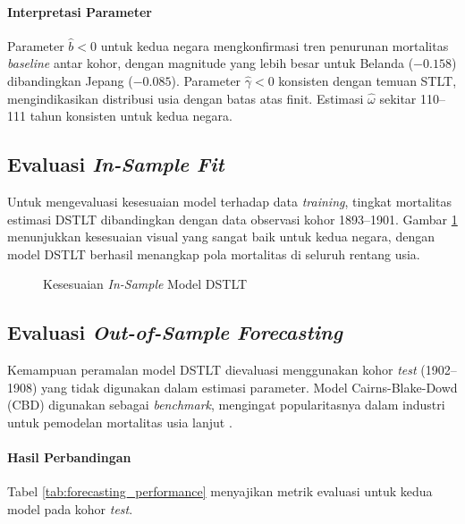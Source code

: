 \paragraph{Interpretasi Parameter}
Parameter $\hat{b} < 0$ untuk kedua negara mengkonfirmasi tren penurunan mortalitas \textit{baseline} antar kohor, dengan magnitude yang lebih besar untuk Belanda ($-0.158$) dibandingkan Jepang ($-0.085$). Parameter $\hat{\gamma} < 0$ konsisten dengan temuan STLT, mengindikasikan distribusi usia dengan batas atas finit. Estimasi $\hat{\omega}$ sekitar 110--111 tahun konsisten untuk kedua negara.

\subsection{Evaluasi \textit{In-Sample Fit}}

Untuk mengevaluasi kesesuaian model terhadap data \textit{training}, tingkat mortalitas estimasi DSTLT dibandingkan dengan data observasi kohor 1893--1901. Gambar \ref{fig:dstlt_insample} menunjukkan kesesuaian visual yang sangat baik untuk kedua negara, dengan model DSTLT berhasil menangkap pola mortalitas di seluruh rentang usia.

\begin{figure}[htbp]
\centering
{}
\caption{Kesesuaian \textit{In-Sample} Model DSTLT}
\label{fig:dstlt_insample}
\end{figure}

\subsection{Evaluasi \textit{Out-of-Sample Forecasting}}

Kemampuan peramalan model DSTLT dievaluasi menggunakan kohor \textit{test} (1902--1908) yang tidak digunakan dalam estimasi parameter. Model Cairns-Blake-Dowd (CBD) digunakan sebagai \textit{benchmark}, mengingat popularitasnya dalam industri untuk pemodelan mortalitas usia lanjut \citep{Cairns2006}.

\paragraph{Hasil Perbandingan}
Tabel \ref{tab:forecasting_performance} menyajikan metrik evaluasi untuk kedua model pada kohor \textit{test}.

